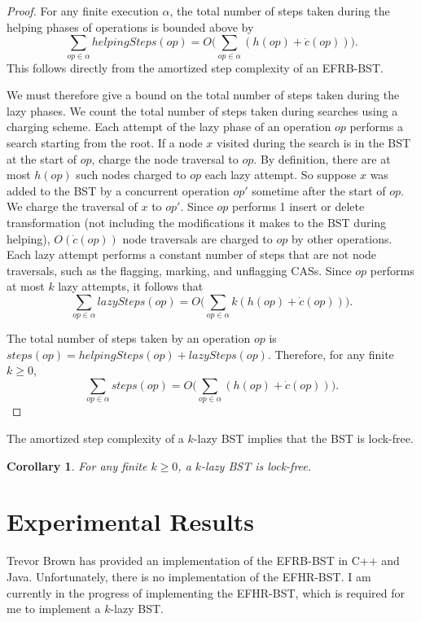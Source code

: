 \documentclass[letterpaper]{article}
\newtheorem{corollary}[theorem]{Corollary}
\begin{document}
\begin{proof}
For any finite execution $\alpha$, the total number of steps taken during the helping phases of operations is bounded above by
\begin{equation*}
\sum_{op\in\alpha} helpingSteps(op) = O\bigg(\sum_{op\in\alpha} (h(op) + \dot{c}(op))\bigg).
\end{equation*}
This follows directly from the amortized step complexity of an EFRB-BST. 

We must therefore give a bound on the total number of steps taken during the lazy phases. We count the total number of steps taken during searches using a charging scheme.  Each attempt of the lazy phase of an operation $op$ performs a search starting from the root. If a node $x$ visited during the search is in the BST at the start of $op$, charge the node traversal to $op$. By definition, there are at most $h(op)$ such nodes charged to $op$ each lazy attempt. So suppose $x$ was added to the BST by a concurrent operation $op'$ sometime after the start of $op$. We charge the traversal of $x$ to $op'$. Since $op$ performs 1 insert or delete transformation (not including the modifications it makes to the BST during helping), $O(\dot{c}(op))$ node traversals are charged to $op$ by other operations. Each lazy attempt performs a constant number of steps that are not node traversals, such as the flagging, marking, and unflagging CASs. Since $op$ performs at most $k$ lazy attempts, it follows that
\begin{equation*}
\sum_{op\in\alpha} lazySteps(op) = O\bigg(\sum_{op\in\alpha} k(h(op) + \dot{c}(op))\bigg).
\end{equation*}

The total number of steps taken by an operation $op$ is $steps(op) = helpingSteps(op) + lazySteps(op)$. Therefore, for any finite $k \geq 0$,
\begin{equation*}
\sum_{op\in\alpha} steps(op) = O\bigg(\sum_{op\in\alpha} (h(op) + \dot{c}(op))\bigg).
\end{equation*}
\end{proof}

The amortized step complexity of a $k$-lazy BST implies that the BST is lock-free.
\begin{corollary}
For any finite $k \geq 0$, a $k$-lazy BST is lock-free.
\end{corollary}

\section{Experimental Results}\label{section_results}
Trevor Brown has provided an implementation of the EFRB-BST in C++ and Java. Unfortunately, there is no implementation of the EFHR-BST. I am currently in the progress of implementing the EFHR-BST, which is required for me to implement a $k$-lazy BST.
\end{document}
